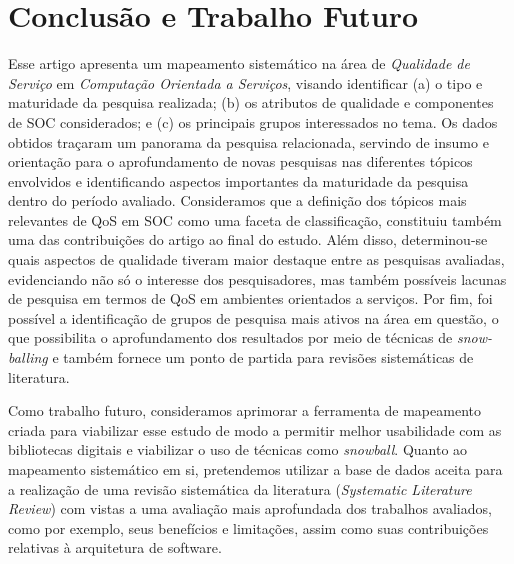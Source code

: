 \section{Conclus\~{a}o e Trabalho Futuro}\label{sec:conclusao}

Esse artigo apresenta um mapeamento sistem\'{a}tico na \'{a}rea 
de \emph{Qualidade de Servi\c co} em \emph{Computa\c c\~{a}o Orientada a Servi\c cos}, visando identificar 
(a) o tipo e maturidade da pesquisa realizada; (b) os atributos de qualidade e componentes de SOC considerados; e (c) os principais grupos interessados no tema. Os dados obtidos tra\c{c}aram um panorama da pesquisa relacionada, servindo de insumo e orientação para o aprofundamento de novas pesquisas nas diferentes tópicos envolvidos e identificando aspectos importantes da maturidade da pesquisa dentro do período avaliado. Consideramos que a definição dos tópicos mais relevantes de QoS em SOC como uma faceta de classificação, constituiu também uma das contribuições do artigo ao final do estudo. Além disso, determinou-se quais aspectos de qualidade tiveram maior destaque entre as pesquisas avaliadas, evidenciando não só o interesse dos pesquisadores, mas também possíveis lacunas de pesquisa em termos de QoS em ambientes orientados a serviços. Por fim, foi possível a identificação de grupos de pesquisa mais ativos na área em questão, o que possibilita o aprofundamento dos resultados por meio de técnicas de \textit{snow-balling} e também fornece um ponto de partida para revisões sistemáticas de literatura.

Como trabalho futuro, consideramos aprimorar a ferramenta de mapeamento criada para viabilizar esse estudo de modo a permitir melhor usabilidade com as bibliotecas digitais e viabilizar o uso de técnicas como \emph{snowball}. Quanto ao mapeamento sistem\'{a}tico em si, pretendemos utilizar a base de dados aceita para a realiza\c{c}\~{a}o de uma revis\~{a}o sistem\'{a}tica da literatura (\emph{Systematic Literature Review}) com vistas a uma avalia\c{c}\~{a}o mais aprofundada dos trabalhos avaliados, como por exemplo, seus benef\'{i}cios e limita\c{c}\~{o}es, assim como suas contribui\c{c}\~{o}es relativas \`{a} arquitetura de software.


